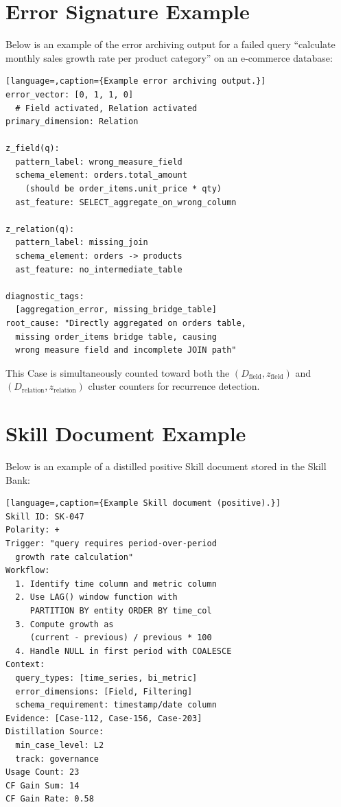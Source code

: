 \section{Error Signature Example}
\label{sec:error_sig_example}

Below is an example of the error archiving output for a failed query ``calculate monthly sales growth rate per product category'' on an e-commerce database:

\begin{lstlisting}[language=,caption={Example error archiving output.}]
error_vector: [0, 1, 1, 0]
  # Field activated, Relation activated
primary_dimension: Relation

z_field(q):
  pattern_label: wrong_measure_field
  schema_element: orders.total_amount
    (should be order_items.unit_price * qty)
  ast_feature: SELECT_aggregate_on_wrong_column

z_relation(q):
  pattern_label: missing_join
  schema_element: orders -> products
  ast_feature: no_intermediate_table

diagnostic_tags:
  [aggregation_error, missing_bridge_table]
root_cause: "Directly aggregated on orders table,
  missing order_items bridge table, causing
  wrong measure field and incomplete JOIN path"
\end{lstlisting}

This Case is simultaneously counted toward both the $(D_{\text{field}}, z_{\text{field}})$ and $(D_{\text{relation}}, z_{\text{relation}})$ cluster counters for recurrence detection.

\section{Skill Document Example}
\label{sec:skill_example}

Below is an example of a distilled positive Skill document stored in the Skill Bank:

\begin{lstlisting}[language=,caption={Example Skill document (positive).}]
Skill ID: SK-047
Polarity: +
Trigger: "query requires period-over-period
  growth rate calculation"
Workflow:
  1. Identify time column and metric column
  2. Use LAG() window function with
     PARTITION BY entity ORDER BY time_col
  3. Compute growth as
     (current - previous) / previous * 100
  4. Handle NULL in first period with COALESCE
Context:
  query_types: [time_series, bi_metric]
  error_dimensions: [Field, Filtering]
  schema_requirement: timestamp/date column
Evidence: [Case-112, Case-156, Case-203]
Distillation Source:
  min_case_level: L2
  track: governance
Usage Count: 23
CF Gain Sum: 14
CF Gain Rate: 0.58
\end{lstlisting}


